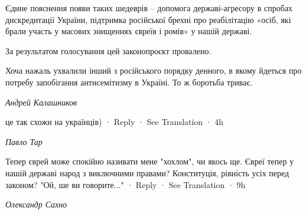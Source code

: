 Єдине пояснення появи таких шедеврів – допомога державі-агресору в спробах
дискредитації України, підтримка російської брехні про  реабілітацію «осіб, які
брали участь у масових знищеннях євреїв і ромів» у нашій державі. 

За результатом голосування цей законопроєкт провалено. 

Хоча нажаль ухвалили інший з російського порядку денного, в якому йдеться про
потребу запобігання антисемітизму в Україні. То ж боротьба триває.

\emph{Андрей Калашников}

це так схожн на українців)
 · Reply · See Translation · 4h

\emph{Павло Тар}

Тепер єврей може спокійно називати мене "хохлом", чи якось ще. Євреї тепер у нашій державі народ з виключними правами? Конституція, рівність усіх перед законом? "Ой, ше ви говорите..."
 · Reply · See Translation · 9h

\emph{Олександр Сахно}

